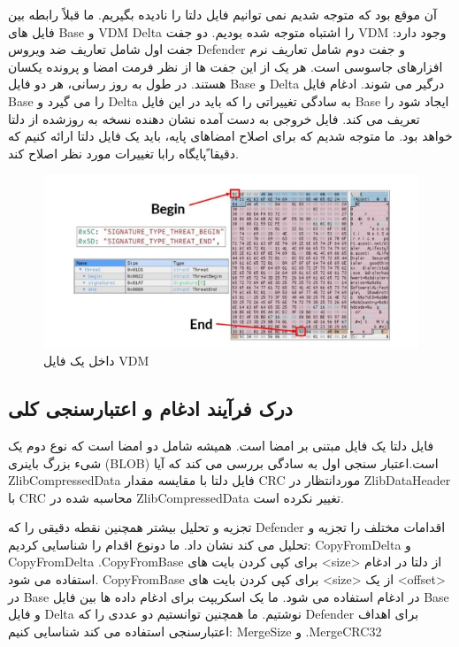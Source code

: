 \documentclass{ISCISC2020}
\begin{document}
آن موقع بود که متوجه شدیم نمی توانیم فایل دلتا را نادیده بگیریم. ما قبلاً رابطه بین فایل های Base و VDM Delta را 
اشتباه متوجه شده بودیم. دو جفت VDM وجود دارد: جفت اول شامل تعاریف ضد ویروس Defender و جفت دوم 
شامل تعاریف نرم افزارهای جاسوسی است. هر یک از این جفت ها از نظر فرمت امضا و پرونده یکسان هستند. در 
طول به روز رسانی، هر دو فایل Base و Delta درگیر می شوند. ادغام فایل Base را می گیرد و Delta به سادگی 
تغییراتی را که باید در این فایل Base ایجاد شود را تعریف می کند. فایل خروجی به دست آمده نشان دهنده نسخه به 
روزشده از دلتا خواهد بود. ما متوجه شدیم که برای اصلاح امضاهای پایه، باید یک فایل دلتا ارائه کنیم که دقیقا ًپایگاه 
رابا تغییرات مورد نظر اصلاح کند.
\begin{figure}[h]
	\includegraphics[width=\linewidth]{Images/5.png}
	\caption{داخل یک فایل VDM}
\end{figure}

\subsection{درک فرآیند ادغام و اعتبارسنجی کلی}
فایل دلتا یک فایل مبتنی بر امضا است. همیشه شامل دو امضا است که نوع دوم یک شیء بزرگ باینری (BLOB)
است.اعتبار سنجی اول به سادگی بررسی می کند که آیا ZlibCompressedData فایل دلتا با مقایسه مقدار CRC
موردانتظار در ZlibDataHeader با CRC محاسبه شده در ZlibCompressedData تغییر نکرده است.


تجزیه و تحلیل بیشتر همچنین نقطه دقیقی را که Defender اقدامات مختلف را تجزیه و تحلیل می کند نشان داد. ما 
دونوع اقدام را شناسایی کردیم: CopyFromDelta و CopyFromDelta .CopyFromBase برای کپی کردن بایت های 
<size> از دلتا در ادغام استفاده می شود. CopyFromBase برای کپی کردن بایت های <size> از یک <offset> در 
Base در ادغام استفاده می شود. ما یک اسکریپت برای ادغام داده ها بین فایل Base و فایل Delta نوشتیم. ما 
همچنین توانستیم دو عددی را که Defender برای اهداف اعتبارسنجی استفاده می کند شناسایی کنیم: MergeSize و 
.MergeCRC32
\end{document}
